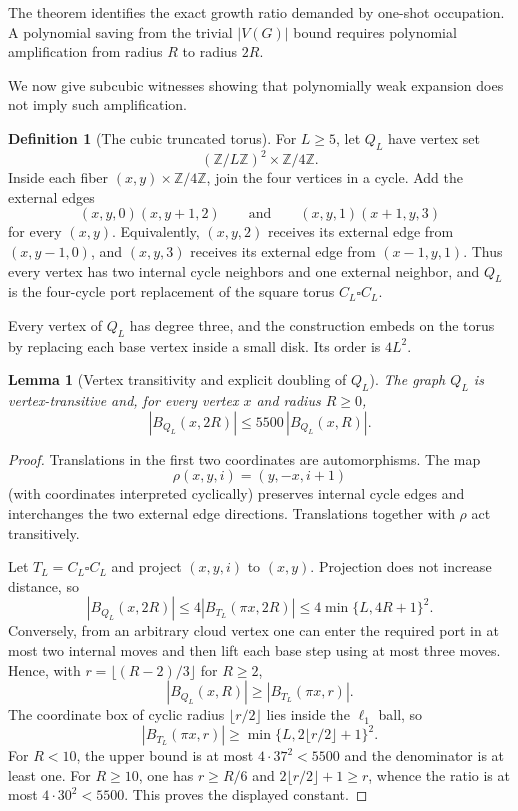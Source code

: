 \documentclass[11pt]{amsart}
\newtheorem{lemma}[theorem]{Lemma}
\theoremstyle{definition}
\newtheorem{definition}[theorem]{Definition}
\begin{document}
The theorem identifies the exact growth ratio demanded by one-shot
occupation.  A polynomial saving from the trivial $|V(G)|$ bound requires
polynomial amplification from radius $R$ to radius $2R$.

We now give subcubic witnesses showing that polynomially weak expansion does
not imply such amplification.

\begin{definition}[The cubic truncated torus]\label{def:Qt}
For $L\ge5$, let $Q_L$ have vertex set
\[
 (\mathbb Z/L\mathbb Z)^2\times\mathbb Z/4\mathbb Z.
\]
Inside each fiber $(x,y)\times\mathbb Z/4\mathbb Z$, join the four vertices in
a cycle.  Add the external edges
\[
 (x,y,0)(x,y+1,2)
 \qquad\text{and}\qquad
 (x,y,1)(x+1,y,3)
\]
for every $(x,y)$.  Equivalently, $(x,y,2)$ receives its external edge from
$(x,y-1,0)$, and $(x,y,3)$ receives its external edge from $(x-1,y,1)$.
Thus every vertex has two internal cycle neighbors and one external neighbor,
and $Q_L$ is the four-cycle port replacement of the square torus
$C_L\square C_L$.
\end{definition}

Every vertex of $Q_L$ has degree three, and the construction embeds on the
torus by replacing each base vertex inside a small disk.  Its order is
$4L^2$.



\begin{lemma}[Vertex transitivity and explicit doubling of $Q_L$]\label{lem:doubling}
The graph $Q_L$ is vertex-transitive and, for every vertex $x$ and radius
$R\ge0$,
\[
 |B_{Q_L}(x,2R)|\le 5500\,|B_{Q_L}(x,R)|.
\]
\end{lemma}

\begin{proof}
Translations in the first two coordinates are automorphisms.  The map
\[
 \rho(x,y,i)=(y,-x,i+1)
\]
(with coordinates interpreted cyclically) preserves internal cycle edges and
interchanges the two external edge directions.  Translations together with
$\rho$ act transitively.

Let $T_L=C_L\square C_L$ and project $(x,y,i)$ to $(x,y)$.  Projection does
not increase distance, so
\[
 |B_{Q_L}(x,2R)|\le4|B_{T_L}(\pi x,2R)|
 \le4\min\{L,4R+1\}^2.
\]
Conversely, from an arbitrary cloud vertex one can enter the required port in
at most two internal moves and then lift each base step using at most three
moves.  Hence, with $r=\lfloor(R-2)/3\rfloor$ for $R\ge2$,
\[
 |B_{Q_L}(x,R)|\ge |B_{T_L}(\pi x,r)|.
\]
The coordinate box of cyclic radius $\lfloor r/2\rfloor$ lies inside the
$\ell_1$ ball, so
\[
 |B_{T_L}(\pi x,r)|
 \ge \min\{L,2\lfloor r/2\rfloor+1\}^2.
\]
For $R<10$, the upper bound is at most $4\cdot37^2<5500$ and the denominator
is at least one.  For $R\ge10$, one has $r\ge R/6$ and
$2\lfloor r/2\rfloor+1\ge r$, whence the ratio is at most
$4\cdot30^2<5500$.  This proves the displayed constant.
\end{proof}
\end{document}
